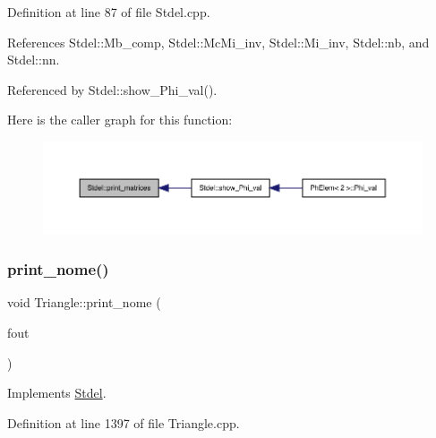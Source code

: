 Definition at line 87 of file Stdel.\+cpp.



References Stdel\+::\+Mb\+\_\+comp, Stdel\+::\+Mc\+Mi\+\_\+inv, Stdel\+::\+Mi\+\_\+inv, Stdel\+::nb, and Stdel\+::nn.



Referenced by Stdel\+::show\+\_\+\+Phi\+\_\+val().

Here is the caller graph for this function\+:
\nopagebreak
\begin{figure}[H]
\begin{center}
\leavevmode
\includegraphics[width=350pt]{classStdel_a319e6a16011b22e12028a841b7686f03_icgraph}
\end{center}
\end{figure}
\mbox{\label{classTriangle_a9943e9f4febaa9025ea324986726fdf6}} 
\subsubsection{\texorpdfstring{print\+\_\+nome()}{print\_nome()}}
{\footnotesize\ttfamily void Triangle\+::print\+\_\+nome (\begin{DoxyParamCaption}\item[{F\+I\+LE $\ast$}]{fout }\end{DoxyParamCaption})\hspace{0.3cm}{\ttfamily [virtual]}}



Implements \hyperlink{classStdel_ac654f45f744ec4cfeab74ed4ded99ef5}{Stdel}.



Definition at line 1397 of file Triangle.\+cpp.

\mbox{\label{classTriangle_a0ab3ad47c3e5432601110f246dec7652}} 
